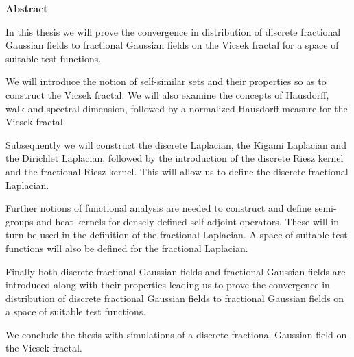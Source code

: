 
\begin{FlushRight}
	\Huge \textbf{Abstract}
\end{FlushRight}

In this thesis we will prove the convergence in distribution of discrete fractional Gaussian fields to fractional Gaussian fields on the Vicsek fractal for a space of suitable test functions.

\vspace{5mm}
We will introduce the notion of self-similar sets and their properties so as to construct the Vicsek fractal. We will also examine the concepts of Hausdorff, walk and spectral dimension, followed by a normalized Hausdorff measure for the Vicsek fractal.

\vspace{5mm}
Subsequently we will construct the discrete Laplacian, the Kigami Laplacian and the Dirichlet Laplacian, followed by the introduction of the discrete Riesz kernel and the fractional Riesz kernel. This will allow us to define the discrete fractional Laplacian. 

Further notions of functional analysis are needed to construct and define semi-groups and heat kernels for densely defined self-adjoint operators. These will in turn be used in the definition of the fractional Laplacian. A space of suitable test functions will also be defined for the fractional Laplacian.

\vspace{5mm}
Finally both discrete fractional Gaussian fields and fractional Gaussian fields are introduced along with their properties leading us to prove the convergence in distribution of discrete fractional Gaussian fields to fractional Gaussian fields on a space of suitable test functions.

\vspace{5mm}
We conclude the thesis with simulations of a discrete fractional Gaussian field on the Vicsek fractal.



